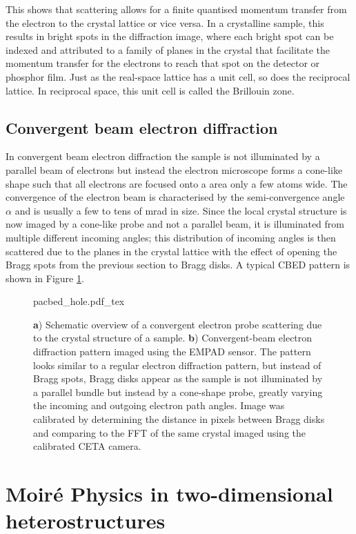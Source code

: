 This shows that scattering allows for a finite quantised momentum transfer from the electron to the crystal lattice or vice versa. In a crystalline sample, this results in bright spots in the diffraction image, where each bright spot can be indexed and attributed to a family of planes in the crystal that facilitate the momentum transfer for the electrons to reach that spot on the detector or phosphor film.
Just as the real-space lattice has a unit cell, so does the reciprocal lattice. In reciprocal space, this unit cell is called the Brillouin zone.




\subsection{Convergent beam electron diffraction}
In convergent beam electron diffraction the sample is not illuminated by a parallel beam of electrons but instead the electron microscope forms a cone-like shape such that all electrons are focused onto a area only a few atoms wide. The convergence of the electron beam is characterised by the semi-convergence angle $\alpha$ and is usually a few to tens of \si{\milli\radian} in size.
Since the local crystal structure is now imaged by a cone-like probe and not a parallel beam, it is illuminated from multiple different incoming angles; this distribution of incoming angles is then scattered due to the planes in the crystal lattice with the effect of opening the Bragg spots from the previous section to Bragg disks. A typical CBED pattern is shown in Figure \ref{fig:pacbed}.
\begin{figure}[hb]
    \centering
    \def\svgwidth{.95\linewidth}
    {pacbed_hole.pdf_tex}
    \caption{\textbf{a}) Schematic overview of a convergent electron probe scattering due to the crystal structure of a sample. \textbf{b}) Convergent-beam electron diffraction pattern imaged using the EMPAD sensor. The pattern looks similar to a regular electron diffraction pattern, but instead of Bragg spots, Bragg disks appear as the sample is not illuminated by a parallel bundle but instead by a cone-shape probe, greatly varying the incoming and outgoing electron path angles. Image was calibrated by determining the distance in pixels between Bragg disks and comparing to the FFT of the same crystal imaged using the calibrated CETA camera.}
    \label{fig:pacbed}
\end{figure}


\section{Moiré Physics in two-dimensional heterostructures}

